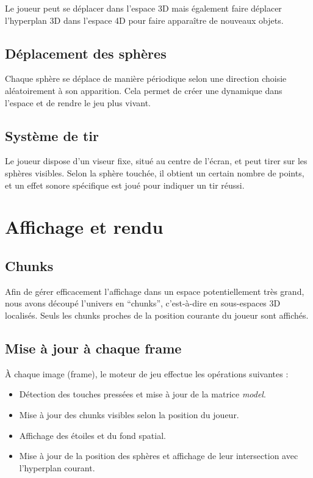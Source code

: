 \documentclass[11pt,a4paper]{article}
\begin{document}
Le joueur peut se déplacer dans l'espace 3D mais également faire déplacer l'hyperplan 3D dans l'espace 4D pour faire apparaître de nouveaux objets.

\subsection{Déplacement des sphères}

Chaque sphère se déplace de manière périodique selon une direction choisie aléatoirement à son apparition. Cela permet de créer une dynamique dans l’espace et de rendre le jeu plus vivant.

\subsection{Système de tir}

Le joueur dispose d’un viseur fixe, situé au centre de l’écran, et peut tirer sur les sphères visibles. Selon la sphère touchée, il obtient un certain nombre de points, et un effet sonore spécifique est joué pour indiquer un tir réussi.

\section{Affichage et rendu}

\subsection{Chunks}

Afin de gérer efficacement l’affichage dans un espace potentiellement très grand, nous avons découpé l’univers en ``chunks'', c’est-à-dire en sous-espaces 3D localisés. Seuls les chunks proches de la position courante du joueur sont affichés.

\subsection{Mise à jour à chaque frame}

À chaque image (frame), le moteur de jeu effectue les opérations suivantes :
\begin{itemize}
    \item Détection des touches pressées et mise à jour de la matrice \textit{model}.
    \item Mise à jour des chunks visibles selon la position du joueur.
    \item Affichage des étoiles et du fond spatial.
    \item Mise à jour de la position des sphères et affichage de leur intersection avec l’hyperplan courant.
\end{itemize}
\end{document}
